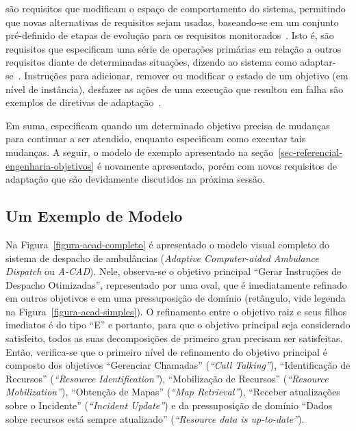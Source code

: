 \evoreqs são requisitos que modificam o espaço de comportamento do sistema, permitindo que novas alternativas de requisitos sejam usadas, baseando-se em um conjunto pré-definido de etapas de evolução para os requisitos monitorados~\cite{souza2012requirement}. Isto é, \evoreqs são requisitos que especificam uma série de operações primárias em relação a outros requisitos diante de determinadas situações, dizendo ao sistema como adaptar-se~\cite{souza2012requirement}. Instruções para adicionar, remover ou modificar o estado de um objetivo (em nível de instância), desfazer as ações de uma execução que resultou em falha são exemplos de diretivas de adaptação~\cite{souza2013requirements}.

Em suma, \awreqs especificam quando um determinado objetivo precisa de mudanças para continuar a ser atendido, enquanto \evoreqs especificam como executar tais mudanças. A seguir, o modelo de exemplo apresentado na seção~\ref{sec-referencial-engenharia-objetivos} é novamente apresentado, porém com novos requisitos de adaptação que são devidamente discutidos na próxima sessão.


\subsection{Um Exemplo de Modelo \gore}
\label{sec-referencial-engenharia-objetivos-exemplo}

Na Figura~\ref{figura-acad-completo} é apresentado o modelo visual completo do sistema de despacho de ambulâncias (\textit{Adaptive Computer-aided Ambulance Dispatch} ou \textit{A-CAD}). Nele, observa-se o objetivo principal ``Gerar Instruções de Despacho Otimizadas'', representado por uma oval, que é imediatamente refinado em outros objetivos e em uma pressuposição de domínio (retângulo, vide legenda na Figura~\ref{figura-acad-simples}). O refinamento entre o objetivo raiz e seus filhos imediatos é do tipo ``E'' e portanto, para que o objetivo principal seja considerado satisfeito, todos as suas decomposições de primeiro grau precisam ser satisfeitas. Então, verifica-se que o primeiro nível de refinamento do objetivo principal é composto dos objetivos ``Gerenciar Chamadas'' (\textit{``Call Talking''}), ``Identificação de Recursos'' (\textit{``Resource Identification''}), ``Mobilização de Recursos'' (\textit{``Resource Mobilization''}), ``Obtenção de Mapas'' (\textit{``Map Retrieval''}), ``Receber atualizações sobre o Incidente'' (\textit{``Incident Update''}) e da pressuposição de domínio ``Dados sobre recursos está sempre atualizado'' (\textit{``Resource data is up-to-date''}).

